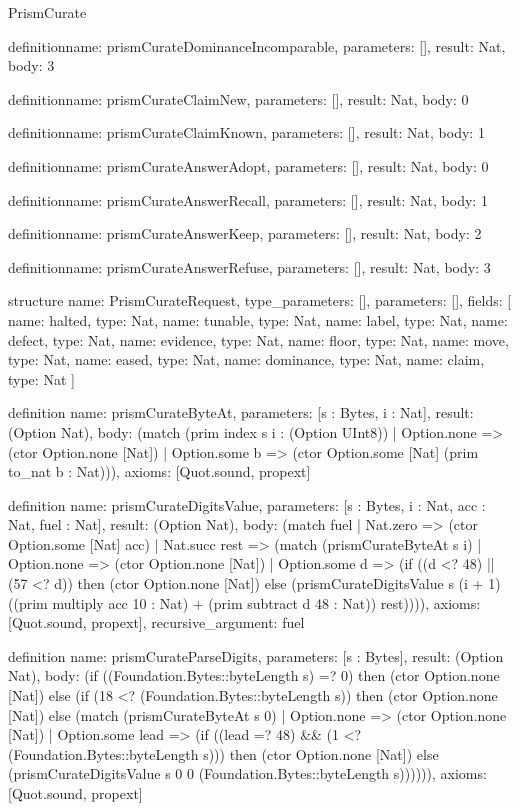 \begin{lexlean}{PrismCurate}
\begin{semanticmodule}
definition{name: prismCurateDominanceIncomparable, parameters: [], result: Nat, body: 3}

definition{name: prismCurateClaimNew, parameters: [], result: Nat, body: 0}

definition{name: prismCurateClaimKnown, parameters: [], result: Nat, body: 1}

definition{name: prismCurateAnswerAdopt, parameters: [], result: Nat, body: 0}

definition{name: prismCurateAnswerRecall, parameters: [], result: Nat, body: 1}

definition{name: prismCurateAnswerKeep, parameters: [], result: Nat, body: 2}

definition{name: prismCurateAnswerRefuse, parameters: [], result: Nat, body: 3}

structure{
  name: PrismCurateRequest,
  type_parameters: [],
  parameters: [],
  fields: [
    {name: halted, type: Nat},
    {name: tunable, type: Nat},
    {name: label, type: Nat},
    {name: defect, type: Nat},
    {name: evidence, type: Nat},
    {name: floor, type: Nat},
    {name: move, type: Nat},
    {name: eased, type: Nat},
    {name: dominance, type: Nat},
    {name: claim, type: Nat}
  ]
}

definition{
  name: prismCurateByteAt,
  parameters: [s : Bytes, i : Nat],
  result: (Option Nat),
  body: (match (prim index s i : (Option UInt8))
    | Option.none => (ctor Option.none [Nat])
    | Option.some b => (ctor Option.some [Nat] (prim to_nat b : Nat))),
  axioms: [Quot.sound, propext]
}

definition{
  name: prismCurateDigitsValue,
  parameters: [s : Bytes, i : Nat, acc : Nat, fuel : Nat],
  result: (Option Nat),
  body: (match fuel
    | Nat.zero => (ctor Option.some [Nat] acc)
    | Nat.succ rest => (match (prismCurateByteAt s i)
      | Option.none => (ctor Option.none [Nat])
      | Option.some d => (if ((d <? 48) || (57 <? d)) then (ctor Option.none [Nat]) else (prismCurateDigitsValue s (i + 1) ((prim multiply acc 10 : Nat) + (prim subtract d 48 : Nat)) rest)))),
  axioms: [Quot.sound, propext],
  recursive_argument: fuel
}

definition{
  name: prismCurateParseDigits,
  parameters: [s : Bytes],
  result: (Option Nat),
  body: (if ((Foundation.Bytes::byteLength s) =? 0) then (ctor Option.none [Nat]) else (if (18 <? (Foundation.Bytes::byteLength s)) then (ctor Option.none [Nat]) else (match (prismCurateByteAt s 0)
    | Option.none => (ctor Option.none [Nat])
    | Option.some lead => (if ((lead =? 48) && (1 <? (Foundation.Bytes::byteLength s))) then (ctor Option.none [Nat]) else (prismCurateDigitsValue s 0 0 (Foundation.Bytes::byteLength s)))))),
  axioms: [Quot.sound, propext]
}


\end{semanticmodule}
\end{lexlean}
